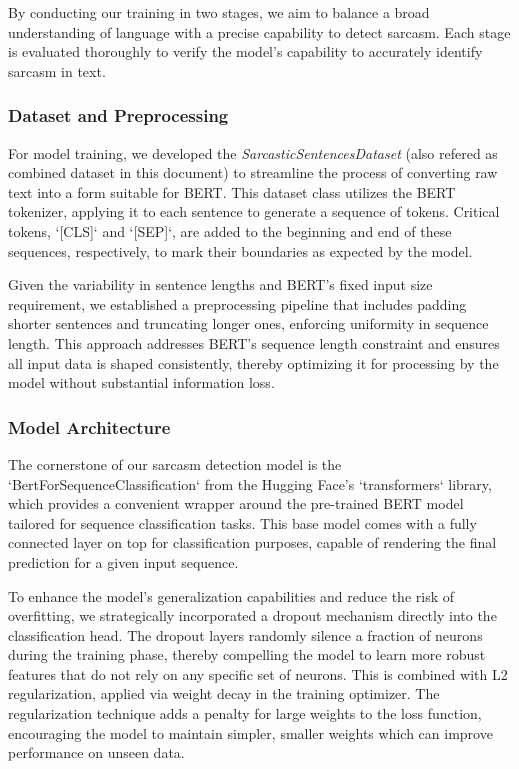 \documentclass[10pt,twocolumn,letterpaper]{article}
\begin{document}
By conducting our training in two stages, we aim to balance a broad understanding of language with a precise capability to detect sarcasm. Each stage is evaluated thoroughly to verify the model’s capability to accurately identify sarcasm in text.  
\subsubsection{Dataset and Preprocessing}
For model training, we developed the \textit{SarcasticSentencesDataset} (also refered as combined dataset in this document) to streamline the process of converting raw text into a form suitable for BERT. This dataset class utilizes the BERT tokenizer, applying it to each sentence to generate a sequence of tokens. Critical tokens, `[CLS]` and `[SEP]`, are added to the beginning and end of these sequences, respectively, to mark their boundaries as expected by the model.

Given the variability in sentence lengths and BERT's fixed input size requirement, we established a preprocessing pipeline that includes padding shorter sentences and truncating longer ones, enforcing uniformity in sequence length. This approach addresses BERT's sequence length constraint and ensures all input data is shaped consistently, thereby optimizing it for processing by the model without substantial information loss.

\subsubsection{Model Architecture}
The cornerstone of our sarcasm detection model is the `BertForSequenceClassification` from the Hugging Face's `transformers` library, which provides a convenient wrapper around the pre-trained BERT model tailored for sequence classification tasks. This base model comes with a fully connected layer on top for classification purposes, capable of rendering the final prediction for a given input sequence.

To enhance the model's generalization capabilities and reduce the risk of overfitting, we strategically incorporated a dropout mechanism directly into the classification head. The dropout layers randomly silence a fraction of neurons during the training phase, thereby compelling the model to learn more robust features that do not rely on any specific set of neurons. This is combined with L2 regularization, applied via weight decay in the training optimizer. The regularization technique adds a penalty for large weights to the loss function, encouraging the model to maintain simpler, smaller weights which can improve performance on unseen data.
\end{document}
